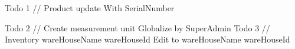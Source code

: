 Todo 1 // Product update With SerialNumber     

Todo 2 // Create measurement unit Globalize by SuperAdmin 
Todo 3 // Inventory wareHouseName wareHouseId Edit to wareHouseName wareHouseId